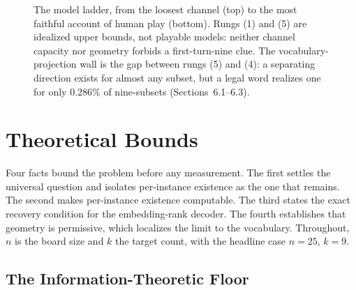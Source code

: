 \documentclass[11pt]{article}
\begin{document}
\begin{figure}[t]
\centering
{}
\caption{The model ladder, from the loosest channel (top) to the most faithful
account of human play (bottom). Rungs (1) and (5) are idealized upper bounds, not
playable models: neither channel capacity nor geometry forbids a first-turn-nine
clue. The vocabulary-projection wall is the gap between rungs (5) and (4): a
separating direction exists for almost any subset, but a legal word realizes one
for only $0.286\%$ of nine-subsets (Sections~6.1--6.3).}
\label{fig:ladder}
\end{figure}

\section{Theoretical Bounds}\label{sec:bounds}

Four facts bound the problem before any measurement. The first settles the
universal question and isolates per-instance existence as the one that remains.
The second makes per-instance existence computable. The third states the exact
recovery condition for the embedding-rank decoder. The fourth establishes that
geometry is permissive, which localizes the limit to the vocabulary.
Throughout, $n$ is the board size and $k$ the target count, with the headline
case $n = 25$, $k = 9$.

\subsection{The Information-Theoretic Floor}
\end{document}
